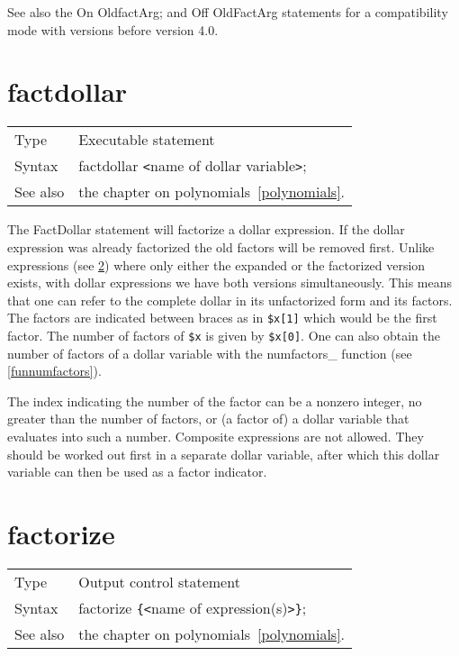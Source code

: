 See also the On OldfactArg; and Off OldFactArg statements for a 
compatibility mode with versions before version 4.0.
\vspace{10mm}


\section{factdollar}
\label{substafactdollar}

\noindent \begin{tabular}{ll}
Type & Executable statement\\
Syntax & factdollar {\tt<}name of dollar variable{\tt>};
\\ See also & the chapter on polynomials~\ref{polynomials}.
\end{tabular} \vspace{4mm}

\noindent The FactDollar statement will factorize a dollar expression. If 
the dollar expression was already factorized the old factors will be 
removed first. Unlike expressions (see \ref{substafactorize}) where only 
either the expanded or the factorized version exists, with dollar 
expressions we have both versions simultaneously. This means that one can 
refer to the complete dollar in its unfactorized form and its factors. The 
factors are indicated between braces as in \verb:$x[1]: which would be the 
first factor. The number of factors of \verb:$x: is given by \verb:$x[0]:. 
One can also obtain the number of factors of a dollar variable with the 
numfactors\_ function (see \ref{funnumfactors}).

\noindent The index indicating the number of the factor can be a nonzero 
integer, no greater than the number of factors, or (a factor of) a dollar 
variable that evaluates into such a number. Composite expressions are not 
allowed. They should be worked out first in a separate dollar variable, 
after which this dollar variable can then be used as a factor indicator.
\vspace{10mm}


\section{factorize}
\label{substafactorize}

\noindent \begin{tabular}{ll}
Type & Output control statement\\
Syntax & factorize \verb:{:{\tt<}name of expression(s){\tt>}\verb:}:;
\\ See also & the chapter on polynomials~\ref{polynomials}.
\end{tabular} \vspace{4mm}

